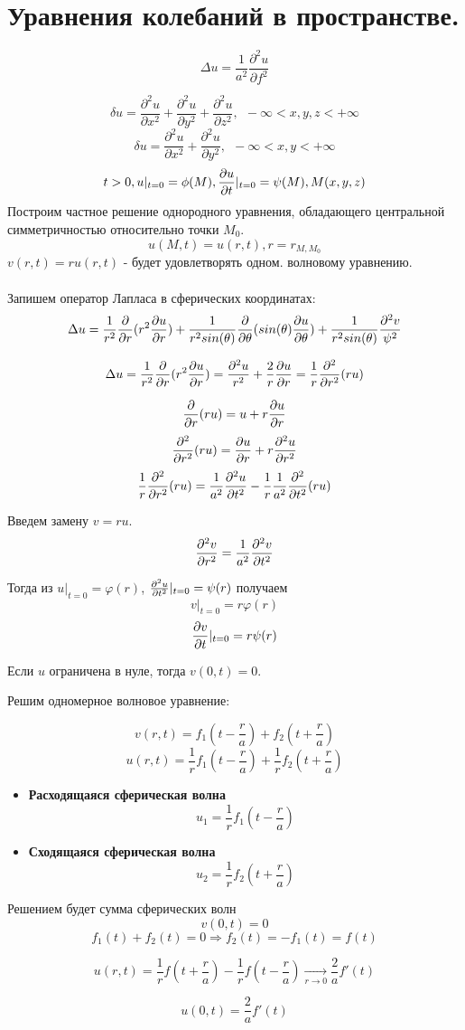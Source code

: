 \documentclass[../main.tex]{subfiles}
\begin{document}
\section{Уравнения колебаний в пространстве.}

$$\Delta u = \frac{1}{a^2}\frac{\partial^2u}{\partial f^2}$$

$$\delta u =\frac{\partial^2u}{\partial x^2} + \frac{\partial^2u}{\partial y^2} + \frac{\partial^2u}{\partial z^2},\ \ -\infty < x,y,z < +\infty$$
$$\delta u =\frac{\partial^2u}{\partial x^2} + \frac{\partial^2u}{\partial y^2},\ \ -\infty < x,y < +\infty$$
$$t>0, u|_{t=0}=\phi(M), \frac{\partial u}{\partial t}|_{t=0}=\psi(M), M(x,y,z)$$
Построим частное решение однородного уравнения, обладающего центральной симметричностью относительно точки $M_0$.
$$u(M,t)=u(r,t), r = r_{M,M_0}$$
$v(r,t)=ru(r,t)$ - будет удовлетворять одном. волновому уравнению.
\\ \\
Запишем оператор Лапласа в сферических координатах:
$$\Delta u = \frac{1}{r^2}\frac{\partial }{\partial r}(r^2\frac{\partial u}{\partial r})+\frac{1}{r^2sin(\theta)}\frac{\partial }{\partial \theta}(sin(\theta)\frac{\partial u}{\partial \theta})+\frac{1}{r^2sin(\theta)}\frac{\partial^2v}{\psi^2}$$

$$\Delta u = \frac{1}{r^2}\frac{\partial }{\partial r}(r^2\frac{\partial u}{\partial r})=\frac{\partial^2u}{r^2}+\frac{2}{r}\frac{\partial u}{\partial r}=\frac{1}{r}\frac{\partial^2}{\partial r^2}(ru)$$

$$\frac{\partial }{\partial r}(ru)=u+r\frac{\partial u}{\partial r}$$
$$\frac{\partial ^2}{\partial r^2}(ru)=\frac{\partial u}{\partial r}+r\frac{\partial ^2u}{\partial r^2}$$
$$\frac{1}{r}\frac{\partial ^2}{\partial r^2}(ru)=\frac{1}{a^2}\frac{\partial ^2u}{\partial t^2}-\frac{1}{r}\frac{1}{a^2}\frac{\partial ^2}{\partial t^2}(ru)$$

Введем замену $v = r u $.
$$\frac{\partial^2 v}{\partial r^2} = \frac{1}{a^2} \frac{\partial^2 v}{\partial t^2} $$

Тогда из $u |_{t=0} = \varphi(r)$, $\frac{\partial^2 u}{\partial t^2} |_{t=0} = \psi(r)$ получаем
$$v |_{t=0} = r \varphi(r)$$
$$\frac{\partial v}{\partial t}|_{t=0} = r \psi(r)$$

Если $u$ ограничена в нуле, тогда $v(0, t)=0$.

Решим одномерное волновое уравнение:

$$v(r, t) = f_1\left(t - \frac{r}{a}\right) + f_2\left(t+ \frac{r}{a}\right)$$
$$u(r, t) = \frac{1}{r} f_1 \left(t - \frac{r}{a}\right) + \frac{1}{r} f_2 \left(t+\frac{r}{a}\right)$$
\begin{itemize}
    \item \textbf{Расходящаяся сферическая волна}
    $$u_1 = \frac{1}{r} f_1\left(t - \frac{r}{a}\right)$$
    \item \textbf{Сходящаяся сферическая волна}
    $$u_2 = \frac{1}{r} f_2\left(t+\frac{r}{a}\right)$$
\end{itemize}
Решением будет сумма сферических волн
$$v(0, t) =0$$
$$f_1(t) + f_2(t) = 0 \Rightarrow f_2(t) = -f_1(t) = f(t)$$

$$u(r, t) = \frac{1}{r}f\left(t+\frac{r}{a}\right) - \frac{1}{r} f\left(t-\frac{r}{a}\right)  \xrightarrow[r \to 0]{} \frac{2}{a} f'(t)$$

$$\boxed{u(0, t) = \frac{2}{a} f'(t)} \label{eq:2.9.1}$$
\end{document}
